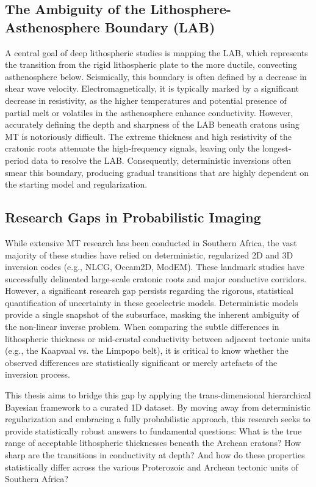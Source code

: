 \subsection{The Ambiguity of the Lithosphere-Asthenosphere Boundary (LAB)}
A central goal of deep lithospheric studies is mapping the LAB, which represents the transition from the rigid lithospheric plate to the more ductile, convecting asthenosphere below. Seismically, this boundary is often defined by a decrease in shear wave velocity. Electromagnetically, it is typically marked by a significant decrease in resistivity, as the higher temperatures and potential presence of partial melt or volatiles in the asthenosphere enhance conductivity. However, accurately defining the depth and sharpness of the LAB beneath cratons using MT is notoriously difficult. The extreme thickness and high resistivity of the cratonic roots attenuate the high-frequency signals, leaving only the longest-period data to resolve the LAB. Consequently, deterministic inversions often smear this boundary, producing gradual transitions that are highly dependent on the starting model and regularization. 

\subsection{Research Gaps in Probabilistic Imaging}
While extensive MT research has been conducted in Southern Africa, the vast majority of these studies have relied on deterministic, regularized 2D and 3D inversion codes (e.g., NLCG, Occam2D, ModEM). These landmark studies have successfully delineated large-scale cratonic roots and major conductive corridors. However, a significant research gap persists regarding the rigorous, statistical quantification of uncertainty in these geoelectric models. Deterministic models provide a single snapshot of the subsurface, masking the inherent ambiguity of the non-linear inverse problem. When comparing the subtle differences in lithospheric thickness or mid-crustal conductivity between adjacent tectonic units (e.g., the Kaapvaal vs. the Limpopo belt), it is critical to know whether the observed differences are statistically significant or merely artefacts of the inversion process. 

This thesis aims to bridge this gap by applying the trans-dimensional hierarchical Bayesian framework to a curated 1D dataset. By moving away from deterministic regularization and embracing a fully probabilistic approach, this research seeks to provide statistically robust answers to fundamental questions: What is the true range of acceptable lithospheric thicknesses beneath the Archean cratons? How sharp are the transitions in conductivity at depth? And how do these properties statistically differ across the various Proterozoic and Archean tectonic units of Southern Africa?

